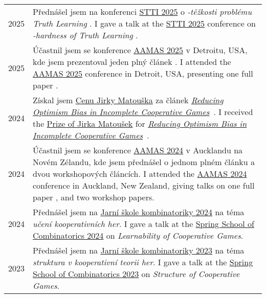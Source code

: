 \begin{tabularx}{\linewidth}{>{\raggedleft\scshape}p{2cm}X}
	2025          & \lng
	{Přednášel jsem na konferenci \href{https://www.mff.cuni.cz/cs/iuuk/akce/konference/stti-2025}{STTI 2025} o \emph{\np-těžkosti problému Truth Learning} \cite{aamas25}.}
	{I gave a talk at the \href{https://www.mff.cuni.cz/cs/iuuk/akce/konference/stti-2025}{STTI 2025} conference on \emph{\np-hardness of Truth Learning} \cite{aamas25}.}
	\\
	2025          & \lng
	{Účastnil jsem se konference \href{https://www.aamas2025.org/}{AAMAS 2025} v Detroitu, USA, kde jsem prezentoval jeden plný článek \cite{aamas25}.}
	{I attended the \href{https://www.aamas2024-conference.auckland.ac.nz/}{AAMAS 2025} conference in Detroit, USA, presenting one full paper \cite{aamas25}.}
	\\
	2024          & \lng
	{Získal jsem \href{https://www.mff.cuni.cz/cs/kam/vyzkum/cena-jirky-matouska}{Cenu Jirky Matouška} za článek  \href{https://www.mff.cuni.cz/cs/kam/vyzkum/cena-jirky-matouska}{\emph{Reducing Optimism Bias in Incomplete Cooperative Games}}~\cite{10.5555/3635637.3663047}.}
	{I received the \href{https://www.mff.cuni.cz/en/kam/research/prize-of-jirka-matousek}{Prize of Jirka Matoušek} for \href{https://www.mff.cuni.cz/cs/kam/vyzkum/cena-jirky-matouska}{\emph{Reducing Optimism Bias in Incomplete Cooperative Games}}~\cite{10.5555/3635637.3663047}.} \\
	2024          & \lng
	{Účastnil jsem se konference \href{https://www.aamas2024-conference.auckland.ac.nz/}{AAMAS 2024} v Aucklandu na Novém Zélandu, kde jsem přednášel o jednom plném článku \cite{10.5555/3635637.3663047} a dvou workshopových článcích.}
	{I attended the \href{https://www.aamas2024-conference.auckland.ac.nz/}{AAMAS 2024} conference in Auckland, New Zealand, giving talks on one full paper \cite{10.5555/3635637.3663047}, and two workshop papers.}
	\\
	2024          & \lng
	{Přednášel jsem na \href{https://kam.mff.cuni.cz/~spring/2024/}{Jarní škole kombinatoriky 2024} na téma \emph{učení kooperativních her}.}
	{I gave a talk at the \href{https://kam.mff.cuni.cz/~spring/2024/}{Spring School of Combinatorics 2024} on \emph{Learnability of Cooperative Games}.} \\
	2023          & \lng
	{Přednášel jsem na \href{https://kam.mff.cuni.cz/~spring/2023/}{Jarní škole kombinatoriky 2023} na téma \emph{struktura v kooperativní teorii her}.}
	{I gave a talk at the \href{https://kam.mff.cuni.cz/~spring/2023/}{Spring School of Combinatorics 2023} on \emph{Structure of Cooperative Games}.} \\

\end{tabularx}
